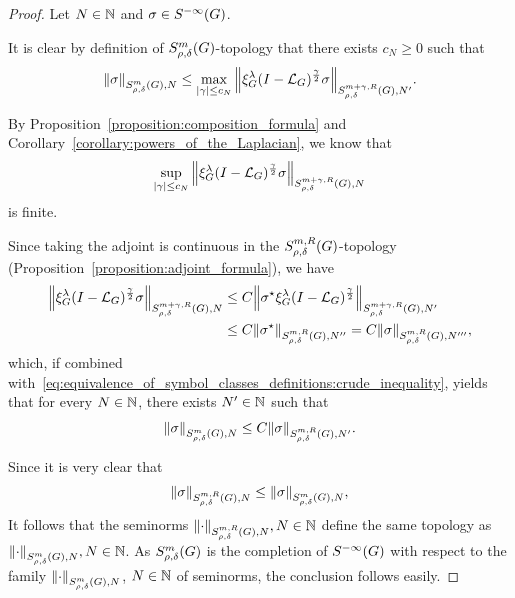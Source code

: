 \begin{proof}
    Let $N \in \mathbb{N}$ and $\sigma \in {S^{-\infty} (G)}$.

    It is clear by definition of $S^{m}_{\rho, \delta}(G)$-topology
    that there exists $c_N \geq 0$ such that
    \begin{align}
        {\left\| \sigma \right\|}_{S^{m}_{\rho, \delta}(G), N}
        \leq \max_{\left|{\gamma}\right| \leq c_{N}} {\left\| \xi^{\lambda}_{G} (I - {\mathcal{L}_{G}})^\frac{\gamma}{2} \sigma \right\|}_{S^{m + \gamma, R}_{\rho, \delta}(G), N'}.
        \label{eq:equivalence_of_symbol_classes_definitions:crude_inequality}
    \end{align}

    By Proposition~\ref{proposition:composition_formula} and Corollary~\ref{corollary:powers_of_the_Laplacian},
    we know that
    \begin{align*}
        \sup_{\left|{\gamma}\right| \leq c_N} {\left\| \xi^{\lambda}_{G} (I - {\mathcal{L}_{G}})^\frac{\gamma}{2} \sigma \right\|}_{S^{m + \gamma, R}_{\rho, \delta}(G), N}
    \end{align*}
    is finite.

    Since taking the adjoint is continuous in the $S^{m, R}_{\rho, \delta}(G)$-topology (Proposition~\ref{proposition:adjoint_formula}),
    we have
    \begin{align*}
        {\left\| \xi^{\lambda}_{G} (I - {\mathcal{L}_{G}})^\frac{\gamma}{2} \sigma \right\|}_{S^{m + \gamma, R}_{\rho, \delta}(G), N}
        &\leq C
        {\left\| {\sigma}^\star \xi^{\lambda}_{G} (I - {\mathcal{L}_{G}})^\frac{\gamma}{2} \right\|}_{S^{m + \gamma, R}_{\rho, \delta}(G), N'}\\
        &\leq C
        {\left\| {\sigma}^\star \right\|}_{S^{m, R}_{\rho, \delta}(G), N''}
        = C {\left\| \sigma \right\|}_{S^{m, R}_{\rho, \delta}(G), N'''},
    \end{align*}
    which,
    if combined with~\eqref{eq:equivalence_of_symbol_classes_definitions:crude_inequality},
    yields that for every $N \in \mathbb{N}$,
    there exists $N' \in \mathbb{N}$ such that
    \begin{align*}
        {\left\| \sigma \right\|}_{S^{m}_{\rho, \delta}(G), N}
        \leq C {\left\| \sigma \right\|}_{S^{m, R}_{\rho, \delta}(G), N'}.
    \end{align*}

    Since it is very clear that
    \begin{align*}
        {\left\| \sigma \right\|}_{S^{m, R}_{\rho, \delta}(G), N}
        \leq {\left\| \sigma \right\|}_{S^{m}_{\rho, \delta}(G), N},
    \end{align*}
    It follows that the seminorms ${\left\| \cdot \right\|}_{S^{m, R}_{\rho, \delta}(G), N}, N \in \mathbb{N}$ define the same topology as ${\left\| \cdot \right\|}_{S^{m}_{\rho, \delta}(G), N}, N \in \mathbb{N}$.
    As $S^{m}_{\rho, \delta}(G)$ is the completion of ${S^{-\infty} (G)}$ with respect to the family ${\left\| \cdot \right\|}_{S^{m}_{\rho, \delta}(G), N}$, $N \in \mathbb{N}$ of seminorms,
    the conclusion follows easily.
\end{proof}

